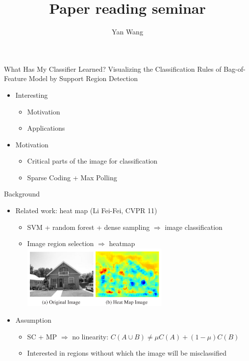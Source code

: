\documentclass[12pt]{beamer}
\author{Yan Wang}
\title{Paper reading seminar}
\subtitle{}
\begin{document}
\begin{frame}[plain]
	\titlepage
\end{frame}

\begin{frame}{What Has My Classifier Learned? Visualizing the Classification Rules of Bag-of-Feature Model by Support Region Detection}
    \begin{itemize}
        \item Interesting
        \begin{itemize}
            \item Motivation
            \item Applications
        \end{itemize}
        \item Motivation
        \begin{itemize}
            \item Critical parts of the image for classification
            \item Sparse Coding + Max Polling
        \end{itemize}
    \end{itemize}
\end{frame}

\begin{frame}{Background}
    \begin{itemize}
        \item Related work: heat map (Li Fei-Fei, CVPR 11)
        \begin{itemize}
            \item SVM + random forest + dense sampling $\Rightarrow$ image classification
            \item Image region selection $\Rightarrow$ heatmap
            \includegraphics[width=0.6\textwidth]{fig1.png}
        \end{itemize}
        \item Assumption
        \begin{itemize}
            \item SC + MP $\Rightarrow$ no linearity: $C(A \cup B) \neq \mu C(A) + (1 - \mu) C(B)$
            \item Interested in regions without which the image will be misclassified
        \end{itemize}
    \end{itemize}
\end{frame}
\end{document}
